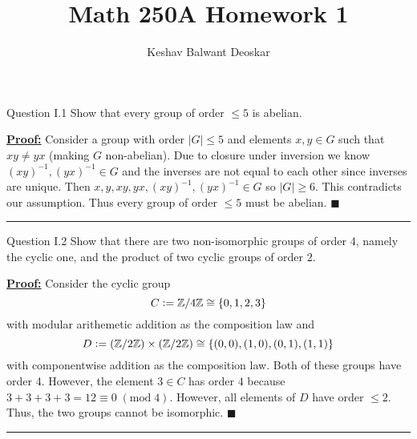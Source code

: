 \documentclass{article}
\title{Math 250A Homework 1}
\author{Keshav Balwant Deoskar}
\newcommand{\bZ}{\mathbb{Z}}
\newcommand{\defeq}{\vcentcolon=}
\newenvironment{proof}[1][Proof]{\par
\vspace{2mm}\noindent\textbf{\underline{#1:} }\rmfamily}{\hfill $\blacksquare$\par\vspace{2mm}}
\begin{document}
\maketitle



\begin{mathdefinitionbox}{Question I.1}
\vskip 0.5cm
Show that every group of order $\leq 5$ is abelian.
\end{mathdefinitionbox}

\vskip 0.5cm

\begin{proof}
  Consider a group with order $|G| \leq 5$ and elements $x, y \in G$ such that $xy \neq yx$ (making $G$ non-abelian). Due to closure under inversion we know $(xy)^{-1}, (yx)^{-1} \in G$ and the inverses are not equal to each other since inverses are unique. Then $x, y, xy, yx, (xy)^{-1}, (yx)^{-1} \in G$ so $|G| \geq 6$. This contradicts our assumption. Thus every group of order $\leq 5$ must be abelian. 
\end{proof}

\vskip 0.5cm
\hrule 
\vskip 0.5cm



\begin{mathdefinitionbox}{Question I.2}
\vskip 0.5cm
Show that there are two non-isomorphic groups of order $4$, namely the cyclic one, and the product of two cyclic groups of order $2$.
\end{mathdefinitionbox}

\vskip 0.5cm
\begin{proof}
  Consider the cyclic group
  \[ C \defeq \bZ / 4 \bZ \cong \{0, 1,2, 3\} \]
  with modular arithemetic addition as the composition law and
  \[ D \defeq \left(\bZ / 2 \bZ \right) \times \left(\bZ / 2 \bZ \right) \cong \{(0, 0), (1, 0), (0, 1), (1,1)\} \]
  with componentwise addition as the composition law. Both of these groups have order 4. However, the element $3 \in C$ has order $4$ because $3 + 3 + 3 + 3 = 12 \equiv 0\; \mathrm{(mod\; 4)}$. However, all elements of $D$ have order $\leq 2$. Thus, the two groups cannot be isomorphic.
\end{proof}

\vskip 0.5cm
\hrule 
\vskip 0.5cm
\end{document}
